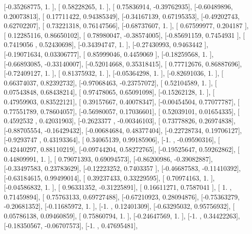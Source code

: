 \documentclass{article}
\begin{document}
       [-0.35268775,  1.        ],
       [ 0.58228265,  1.        ],
       [ 0.75836914, -0.39762935],
       [-0.60489896,  0.20073813],
       [ 0.17711422,  0.94385349],
       [-0.34167139,  0.67195353],
       [-0.49202743,  0.62702207],
       [ 0.73221318,  0.76147566],
       [-0.68737607,  1.        ],
       [ 0.67599977,  0.204187  ],
       [ 0.12285116,  0.86650102],
       [ 0.78980047, -0.38574005],
       [-0.85691159,  0.7454931 ],
       [ 0.7419056 ,  0.52430698],
       [-0.34394747,  1.        ],
       [-0.27430993,  0.9463442 ],
       [-0.19071634,  0.03306777],
       [ 0.85999046,  0.4459069 ],
       [-0.18259568,  1.        ],
       [-0.66893085, -0.33140007],
       [-0.52014668,  0.35318415],
       [ 0.77712676,  0.86887696],
       [-0.72409127,  1.        ],
       [ 0.81375932,  1.        ],
       [-0.05364298,  1.        ],
       [-0.82691036,  1.        ],
       [ 0.66374037,  0.82392732],
       [-0.97068463, -0.23757072],
       [ 0.52104589,  1.        ],
       [ 0.07543848,  0.68438214],
       [ 0.97478065,  0.65091098],
       [-0.15262128,  1.        ],
       [ 0.47959903,  0.83522121],
       [ 0.39157667,  0.40078347],
       [-0.00454504,  0.77077787],
       [ 0.77551789,  0.78604057],
       [-0.56980057,  0.17036601],
       [ 0.52039101,  0.01654335],
       [ 0.4592532 ,  0.42031903],
       [-0.2623377 , -0.00346103],
       [ 0.73778826,  0.26974838],
       [-0.88705554, -0.16429432],
       [-0.00684684,  0.48377404],
       [-0.22728734,  0.19706127],
       [-0.9293747 ,  0.43193364],
       [ 0.34065139,  0.99185906],
       [-1.        , -0.09590316],
       [ 0.42440297,  0.88110219],
       [-0.09744204,  0.58272765],
       [-0.19525647,  0.59262862],
       [ 0.44809991,  1.        ],
       [ 0.79071393,  0.69094573],
       [-0.86200986, -0.39082887],
       [-0.33497583,  0.23783629],
       [-0.12223252,  0.7403357 ],
       [-0.46687583, -0.11410392],
       [-0.63184615,  0.99499014],
       [ 0.39237433,  0.33229595],
       [ 0.70974163,  1.        ],
       [-0.04586832,  1.        ],
       [ 0.96331352, -0.31225891],
       [ 0.16611271,  0.7587041 ],
       [ 1.        ,  0.71459894],
       [ 0.75763133,  0.69727488],
       [-0.67210923,  0.28094876],
       [-0.75363279, -0.20681352],
       [-0.11685972,  1.        ],
       [-1.        ,  0.12401309],
       [-0.63295032,  0.95756932],
       [ 0.05786138,  0.09460859],
       [ 0.75860794,  1.        ],
       [-0.24647569,  1.        ],
       [-1.        ,  0.34422263],
       [-0.18350567, -0.06707573],
       [-1.        ,  0.47695481],
\end{document}
